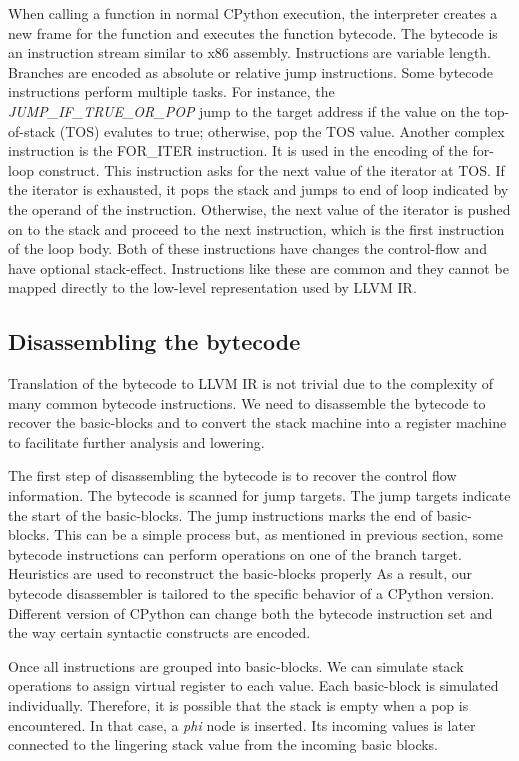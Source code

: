 \documentclass{acm_proc_article-sp}
\begin{document}
When calling a function in normal CPython execution, the interpreter creates
a new frame for the function and executes the function bytecode.
The bytecode is an instruction stream similar to x86 assembly.
Instructions are variable length. Branches are encoded as absolute or relative
jump instructions. Some bytecode instructions perform multiple tasks.
For instance, the \textit{JUMP\_IF\_TRUE\_OR\_POP} jump to the
target address if the value on the top-of-stack (TOS) evalutes to true;
otherwise, pop the TOS value.  Another complex instruction is the FOR\_ITER
instruction.  It is used in the encoding of the for-loop construct.
This instruction asks for the next value of the iterator at TOS.
If the iterator is exhausted, it pops the stack and jumps to end of loop
indicated by the operand of the instruction.  Otherwise, the next value of the
iterator is pushed on to the stack and proceed to the next instruction, which
is the first instruction of the loop body. Both of these instructions have
changes the control-flow and have optional stack-effect. \cite{pythondoc:dis}
Instructions like these are common and they cannot be mapped directly to
the low-level representation used by LLVM IR.

\subsection{Disassembling the bytecode}

Translation of the bytecode to LLVM IR is not trivial due to the
complexity of many common bytecode instructions.  We need to disassemble
the bytecode to recover the basic-blocks and to convert the stack machine into
a register machine to facilitate further analysis and lowering.

The first step of disassembling the bytecode is to recover the control flow
information. The bytecode is scanned for jump targets. The jump targets
indicate the start of the basic-blocks.  The jump instructions marks the
end of basic-blocks. This can be a simple process but, as mentioned in previous
section, some bytecode instructions can perform  operations on one of the
branch target.  Heuristics are used to reconstruct the basic-blocks properly
As a result, our bytecode disassembler is tailored to the specific behavior of
a CPython version.  Different version of CPython can change both the bytecode
instruction set and the way certain syntactic constructs are encoded.

Once all instructions are grouped into basic-blocks. We can simulate stack
operations to assign virtual register to each value.  Each basic-block is
simulated individually. Therefore, it is possible that the stack is empty when
a pop is encountered. In that case, a \textit{phi} node is inserted.
Its incoming values is later connected to the lingering stack value from the
incoming basic blocks.
\end{document}
